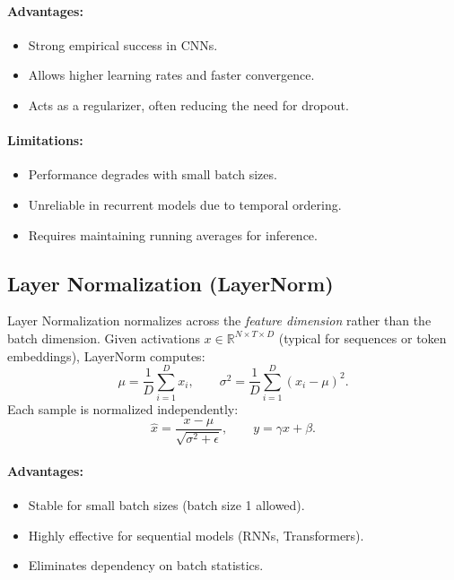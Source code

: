 \documentclass[12pt,a4paper]{report}
\begin{document}
\paragraph{Advantages:}
\begin{itemize}
    \item Strong empirical success in CNNs.
    \item Allows higher learning rates and faster convergence.
    \item Acts as a regularizer, often reducing the need for dropout.
\end{itemize}

\paragraph{Limitations:}
\begin{itemize}
    \item Performance degrades with small batch sizes.
    \item Unreliable in recurrent models due to temporal ordering.
    \item Requires maintaining running averages for inference.
\end{itemize}

\vspace{1em}
\subsection{Layer Normalization (LayerNorm)}

Layer Normalization normalizes across the \textit{feature dimension} rather than the batch dimension.  
Given activations $x \in \mathbb{R}^{N \times T \times D}$ (typical for sequences or token embeddings), LayerNorm computes:
\[
\mu = \frac{1}{D} \sum_{i=1}^D x_i,
\qquad
\sigma^2 = \frac{1}{D} \sum_{i=1}^D (x_i - \mu)^2.
\]
Each sample is normalized independently:
\[
\hat{x} = \frac{x - \mu}{\sqrt{\sigma^2 + \epsilon}},
\qquad
y = \gamma \hat{x} + \beta.
\]

\paragraph{Advantages:}
\begin{itemize}
    \item Stable for small batch sizes (batch size 1 allowed).
    \item Highly effective for sequential models (RNNs, Transformers).
    \item Eliminates dependency on batch statistics.
\end{itemize}
\end{document}

